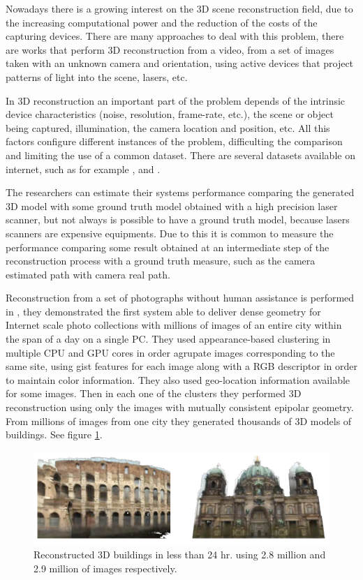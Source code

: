  
Nowadays there is a growing interest on the 3D scene reconstruction field, due to the increasing computational power and the reduction of 
the costs of the capturing devices. There are many approaches to deal with this problem, there are works that perform 3D reconstruction 
from a video, from a set of images taken with an unknown camera and orientation, using active devices that project patterns of light into 
the scene, lasers, etc. 

In 3D reconstruction an important part of the problem depends of the intrinsic 
device characteristics (noise, resolution, frame-rate, etc.), the scene or object being captured, illumination, the camera location and position, etc. All this 
factors configure different instances of the problem, difficulting the comparison and limiting the use of a common dataset. There are several datasets 
available on internet, such as for example \cite{sturm12iros},  \cite{LaiBRF11} and \cite{ShottonGZICF13}.

The researchers can estimate their systems performance comparing the generated 3D model with some 
ground truth model obtained with a high precision laser scanner, but not always is possible to have a ground truth model, because lasers scanners 
are expensive equipments. Due to this it is common to measure the performance
 comparing some result obtained at an intermediate step of the reconstruction process with a ground truth measure, 
such as the camera estimated path with camera real path.   

Reconstruction from a set of photographs without human assistance is performed in \cite{jan}, they demonstrated the first system able to deliver dense geometry for Internet scale photo collections with millions of images of an entire city within the span of a day on a single PC. They used appearance-based clustering in multiple CPU and GPU cores 
in order agrupate images corresponding to the same site, using gist features for each image along with a RGB
descriptor in order to maintain color information. They also used geo-location information available for some  images. 
Then in each one of the clusters they performed 3D reconstruction using only the images with mutually consistent epipolar 
geometry. From millions of images from one city they generated thousands of 3D models of buildings. See figure \ref{fig:jan}. 


\begin{figure}[h!]
\begin{center}
\includegraphics[scale=0.25]{images/jan}
\caption{Reconstructed 3D buildings in less than 24 hr. using 2.8 million and 2.9 million of images respectively.}
\label{fig:jan}
\end{center}
\end{figure}

